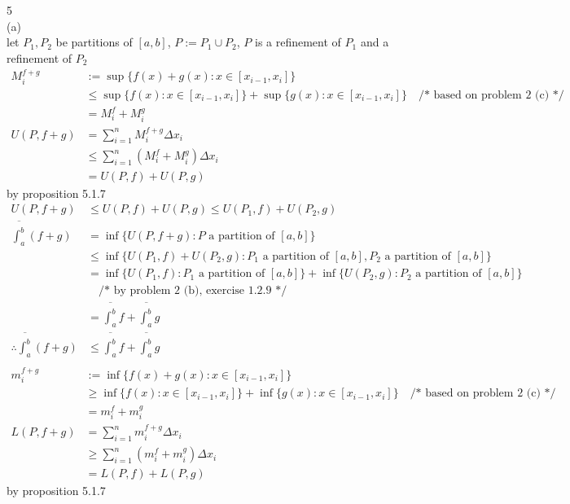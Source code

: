 \documentclass[12pt, border = 4pt, multi]{article} %
\begin{document}
\\
\\
5\\
(a)\\
let $P_1, P_2$ be partitions of $[a, b]$, $P := P_1 \cup P_2$, $P$ is a refinement of $P_1$ and a refinement of $P_2$
\begin{align*}
M_i ^ {f + g} &:= \sup\{f(x) + g(x): x \in [x_{i - 1}, x_i]\}\\
&\leq \sup\{f(x): x \in [x_{i - 1}, x_i]\} + \sup\{g(x): x \in [x_{i - 1}, x_i]\} \quad\text{/* based on problem 2 (c) */}\\
&= M_i ^ f + M_i ^ g\\
U(P, f + g) &= \sum_{i = 1} ^ n M_i ^ {f + g} \Delta x_i\\
&\leq \sum_{i = 1} ^ n (M_i ^ f + M_i ^ g) \Delta x_i\\
&= U(P, f) + U(P, g)
\end{align*}
by proposition 5.1.7
\begin{align*}
U(P, f + g) &\leq U(P, f) + U(P, g) \leq U(P_1, f) + U(P_2, g)\\
\overline{\int_a ^ b} (f + g) &= \inf\{U(P, f + g): P \text{ a partition of }[a, b]\}\\
&\leq \inf\{U(P_1, f) + U(P_2, g): P_1 \text{ a partition of }[a, b], P_2 \text{ a partition of }[a, b]\}\\
&= \inf\{U(P_1, f): P_1 \text{ a partition of }[a, b]\} + \inf\{U(P_2, g): P_2 \text{ a partition of }[a, b]\}\\
&\quad\text{/* by problem 2 (b), exercise 1.2.9 */}\\
&= \overline{\int_a ^ b} f + \overline{\int_a ^ b} g\\
\therefore \overline{\int_a ^ b} (f + g) &\leq \overline{\int_a ^ b} f + \overline{\int_a ^ b} g\\
\end{align*}
\begin{align*}
m_i ^ {f + g} &:= \inf\{f(x) + g(x): x \in [x_{i - 1}, x_i]\}\\
&\geq \inf\{f(x): x \in [x_{i - 1}, x_i]\} + \inf\{g(x): x \in [x_{i - 1}, x_i]\} \quad\text{/* based on problem 2 (c) */}\\
&= m_i ^ f + m_i ^ g\\
L(P, f + g) &= \sum_{i = 1} ^ n m_i ^ {f + g} \Delta x_i\\
&\geq \sum_{i = 1} ^ n (m_i ^ f + m_i ^ g) \Delta x_i\\
&= L(P, f) + L(P, g)
\end{align*}
by proposition 5.1.7
\end{document}
